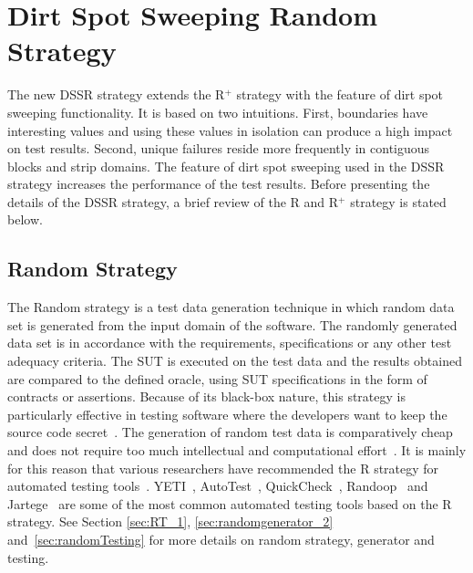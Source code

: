 
\section{Dirt Spot Sweeping Random Strategy}\label{sec:dssr}
The new DSSR strategy extends the R$^+$ strategy with the feature of dirt spot sweeping functionality. It is based on two intuitions. First, boundaries have interesting values and using these values in isolation can produce a high impact on test results. Second, unique failures reside more frequently in contiguous blocks and strip domains. The feature of dirt spot sweeping used in the DSSR strategy increases the performance of the test results. Before presenting the details of the DSSR strategy, a brief review of the R and R$^+$ strategy is stated below.

\subsection{Random Strategy}
The Random strategy is a test data generation technique in which random data set is generated from the input domain of the software. The randomly generated data set is in accordance with the requirements, specifications or any other test adequacy criteria. The SUT is executed on the test data and the results obtained are compared to the defined oracle, using SUT specifications in the form of contracts or assertions. Because of its black-box nature, this strategy is particularly effective in testing software where the developers want to keep the source code secret~\cite{chen2010adaptive}. The generation of random test data is comparatively cheap and does not require too much intellectual and computational effort~\cite{ciupa2008finding, ciupa2011number}. It is mainly for this reason that various researchers have recommended the R strategy for automated testing tools~\cite{ciupa2008artoo}.
 YETI~\cite{oriol2010yeti, oriol2012random}, AutoTest~\cite{leitner2007reconciling, ciupa2007experimental}, QuickCheck~\cite{claessen2011quickcheck}, Randoop~\cite{pacheco2007randoop, pacheco2007feedback} and Jartege~\cite{oriat2005jartege} are some of the most common automated testing tools based on the R strategy. See Section \ref{sec:RT_1}, \ref{sec:randomgenerator_2} and~\ref{sec:randomTesting} for more details on random strategy, generator and testing.


